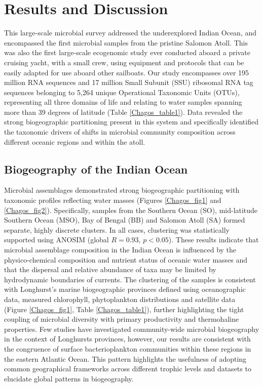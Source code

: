 \section{Results and Discussion}

This large-scale microbial survey addressed the underexplored Indian Ocean, and encompassed the first microbial samples from the pristine Salomon Atoll. This was also the first large-scale ecogenomic study ever conducted aboard a private cruising yacht, with a small crew, using equipment and protocols that can be easily adapted for use aboard other sailboats. \cite{lauro_common_2014} Our study encompasses over 195 million RNA sequences and 17 million Small Subunit (SSU) ribosomal RNA tag sequences belonging to 5,264 unique Operational Taxonomic Units (OTUs), representing all three domains of life and relating to water samples spanning more than 39 degrees of latitude (Table \ref{Chagos_table1}). Data revealed the strong biogeographic partitioning present in this system and specifically identified the taxonomic drivers of shifts in microbial community composition across different oceanic regions and within the atoll.



\subsection{Biogeography of the Indian Ocean}

Microbial assemblages demonstrated strong biogeographic partitioning with taxonomic profiles reflecting water masses (Figures \ref{Chagos_fig1} and \ref{Chagos_fig2}). Specifically, samples from the Southern Ocean (SO), mid-latitude Southern Ocean (MSO), Bay of Bengal (BB) and Salomon Atoll (SA) formed separate, highly discrete clusters. In all cases, clustering was statistically supported using ANOSIM (global $R = 0.93$, $p < 0.05$). These results indicate that microbial assemblage composition in the Indian Ocean is influenced by the physico-chemical composition and nutrient status of oceanic water masses and that the dispersal and relative abundance of taxa may be limited by hydrodynamic boundaries of currents. \cite{brown_trait_2014} The clustering of the samples is consistent with Longhurst's marine biogeographic provinces \cite{longhurst_estimate_1995} defined using oceanographic data, measured chlorophyll, phytoplankton distributions and satellite data (Figure \ref{Chagos_fig1}, Table \ref{Chagos_table1}), further highlighting the tight coupling of microbial diversity with primary productivity and thermohaline properties. Few studies have investigated community-wide microbial biogeography in the context of Longhursts provinces, however, our results are consistent with the congruence of surface bacterioplankton communities within these regions in the eastern Atlantic Ocean. \cite{friedline_bacterial_2012} This pattern highlights the usefulness of adopting common geographical frameworks across different trophic levels and datasets to elucidate global patterns in biogeography. \cite{brown_trait_2014}

